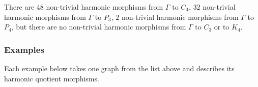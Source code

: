\documentclass[12pt,letterpaper]{article}
\theoremstyle{definition}
\begin{document}
\begin{enumerate}
There are $48$ non-trivial harmonic morphisms from $\Gamma$ to $C_4$,
$32$ non-trivial harmonic morphisms from $\Gamma$ to $P_3$,
$2$ non-trivial harmonic morphisms from $\Gamma$ to $P_4$, but
there are no non-trivial harmonic morphisms from $\Gamma$ to $C_3$
or to $K_4$.


\end{enumerate}



\subsubsection{Examples}

Each example below takes one graph from the list above and describes
its harmonic quotient morphisms.
\end{document}
